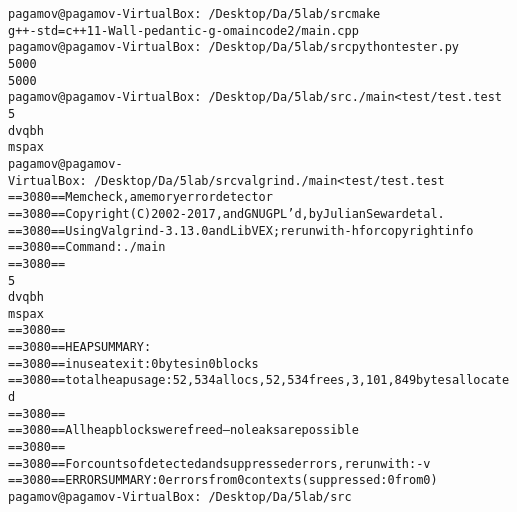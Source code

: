 \begin{alltt}
pagamov@pagamov-VirtualBox:~/Desktop/Da/5lab/src make
g++ -std=c++11 -Wall -pedantic -g -o main code2/main.cpp
pagamov@pagamov-VirtualBox:~/Desktop/Da/5lab/src python tester.py 
5000
5000
pagamov@pagamov-VirtualBox:~/Desktop/Da/5lab/src ./main < test/test.test 
5
dvqbh
mspax
pagamov@pagamov-VirtualBox:~/Desktop/Da/5lab/src valgrind ./main < test/test.test 
==3080== Memcheck, a memory error detector
==3080== Copyright (C) 2002-2017, and GNU GPL'd, by Julian Seward et al.
==3080== Using Valgrind-3.13.0 and LibVEX; rerun with -h for copyright info
==3080== Command: ./main
==3080== 
5
dvqbh
mspax
==3080== 
==3080== HEAP SUMMARY:
==3080==     in use at exit: 0 bytes in 0 blocks
==3080==   total heap usage: 52,534 allocs, 52,534 frees, 3,101,849 bytes allocated
==3080== 
==3080== All heap blocks were freed -- no leaks are possible
==3080== 
==3080== For counts of detected and suppressed errors, rerun with: -v
==3080== ERROR SUMMARY: 0 errors from 0 contexts (suppressed: 0 from 0)
pagamov@pagamov-VirtualBox:~/Desktop/Da/5lab/src
\end{alltt}

\pagebreak